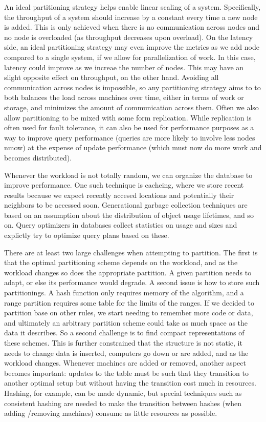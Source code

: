 An ideal partitioning strategy helps enable linear scaling of a system. Specifically, the throughput of a system should increase by a constant every time a new node is added. This is only achieved when there is no communication across nodes and no node is overloaded (as throughput decreases upon overload). On the latency side, an ideal partitioning strategy may even improve the metrics as we add node  compared to a single system, if we allow for  parallelization of work. In this case, latency could improve as we increae the number of nodes.  This may have an slight opposite effect on throughput, on the other hand. Avoiding all communication across nodes is impossible, so any partitioning strategy aims to to both balances the load across machines over time, either in terms of work or storage, and minimizes the amount of communication across them.   Often we also allow partitioning to be mixed with some form replication. While replication is often used for fault tolerance, it can also be used for performance purposes as a way to improve query performance (queries are more likely to involve less nodes nmow) at the expense of update performance (which must now do more work and becomes distributed).  

 Whenever the workload is not totally random, we can organize the database to improve performance. One such technique is cacheing, where we store recent results because we expect recently accesed locations and potentially their neighbors to be accessed soon.  Generational garbage collection techniques are based on an assumption about the distribution of object usage lifetimes, and so on. Query optimizers in databases collect statistics on usage and sizes and explictly try to optimize query plans based on these. 

There are at least two large challenges when attempting to partition. The first is that the optimal partitioning scheme depends on the workload, and as the workload changes so does the appropriate partition.  A given partition  needs to adapt, or else its performance would degrade.   A second issue is how to store such partitionings. A hash function  only requires memory of the algorithm, and a range partition requires some table for the limits of the ranges. If we decided to partition base on other rules, we start needing to remember more code or data,  and ultimately an arbitrary partition scheme could take as much space as the data it describes. So a second challenge is to find compact representations of these schemes. This is further constrained that the structure is not static, it needs to change data is inserted, computers go down or are added,  and as the workload changes. Whenever machines are added or removed, another aspect becomes important: updates to the table must be such that they transition to another optimal setup but without having the transition cost much in resources.   Hashing, for example, can be made dynamic, but special techniques such as consistent hashing are needed to make the transition between hashes (when adding /removing machines) consume as little resources as possible.

